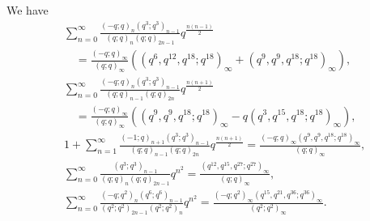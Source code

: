 \documentclass[10pt,a4paper]{amsart}
\begin{document}
\begin{corollary}
We have
\begin{align}
&\sum_{n=0}^{\infty}\frac{\left(-q;q\right)_n\left(q^3;q^3\right)_{n-1}
}
{\left(q;q\right)_{n}\left(q;q\right)_{2n-1}}q^{\frac{n(n-1)}{2}}\nonumber\\
&\quad=\frac{\left(-q;q\right)_{\infty}}{\left(q;q\right)_{\infty}}
\left(
\left(q^{6},q^{12},q^{18};q^{18}\right)_{\infty}+
\left(q^{9},q^{9},q^{18};q^{18}\right)_{\infty}\right)
,\tag{S.73}\label{S.73}\\
&\sum_{n=0}^{\infty}\frac{\left(-q;q\right)_n\left(q^3;q^3\right)_{n-1}
}
{\left(q;q\right)_{n-1}\left(q;q\right)_{2n}}q^{\frac{n(n+1)}{2}}\nonumber\\
&\quad=\frac{\left(-q;q\right)_{\infty}}{\left(q;q\right)_{\infty}}
\left(
\left(q^{9},q^{9},q^{18};q^{18}\right)_{\infty}-q
\left(q^{3},q^{15},q^{18};q^{18}\right)_{\infty}\right)
,\tag{S.75}\label{S.75}\\
&1+\sum_{n=1}^{\infty}\frac{\left(-1;q\right)_{n+1}\left(q^3;q^3\right)_{n-1}
}
{\left(q;q\right)_{n-1}\left(q;q\right)_{2n}}q^{\frac{n(n+1)}{2}}
=\frac{\left(-q;q\right)_{\infty}\left(q^{9},q^{9},q^{18};q^{18}\right)_{\infty}}{\left(q;q\right)_{\infty}}
,\tag{S.78}\label{S.78}\\
&\sum_{n=0}^{\infty}\frac{\left(q^3;q^3\right)_{n-1}}
{\left(q;q\right)_n\left(q;q\right)_{2n-1}}q^{n^2}
=\frac{\left(q^{12},q^{15},q^{27};q^{27}\right)_{\infty}}{\left(q;q\right)_{\infty}}
,\tag{S.93}\label{S.93}\\
&\sum_{n=0}^{\infty}\frac{\left(-q;q^2\right)_{n}
\left(q^6;q^6\right)_{n-1}}
{\left(q^2;q^2\right)_{2n-1}\left(q^2;q^2\right)_n}q^{n^2}
=\frac{\left(-q;q^2\right)_{\infty}\left(q^{15},q^{21},q^{36};q^{36}\right)_{\infty}}
{\left(q^2;q^2\right)_{\infty}}.\tag{S.114} \label{S.114}
\end{align}
\end{corollary}
\end{document}

